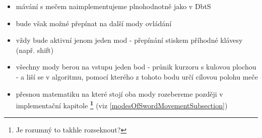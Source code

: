 \begin{itemize}
\begin{itemize}
                \begin{itemize}
                    \item mávání s mečem naimplementujeme plnohodnotně jako v DbtS 
                    \item bude však možné přepínat na další mody ovládání
                    \item vždy bude aktivní jenom jeden mod - přepínání stiskem příhodné klávesy (např. shift)
                    \item všechny mody berou na vstupu jeden bod - průnik kurzoru s kulovou plochou - a liší se v algoritmu, pomocí kterého z tohoto bodu určí cílovou polohu meče
                    \item přesnou matematiku na které stojí oba mody rozebereme později v implementační kapitole \textbf{\footnote{Je rozumný to takhle rozseknout?}} (viz \ref{modesOfSwordMovementSubsection})
                \end{itemize}
        \end{itemize}
\end{itemize}

